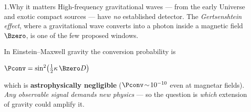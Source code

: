 \begin{block}{1.\quad Why it matters}
  High-frequency gravitational waves --- from the early Universe and exotic
  compact sources --- have \emph{no} established detector. The
  \emph{Gertsenshtein effect}, where a gravitational wave converts into a
  photon inside a magnetic field $\Bzero$, is one of the few proposed windows.

  \vspace{1ex}
  In Einstein--Maxwell gravity the conversion probability is
  \begin{exampleblock}{}
    \centering\large
    $\Pconv = \sin^2\!\big(\tfrac{1}{2}\kappa\,\Bzero D\big)$
  \end{exampleblock}
  which is \textbf{astrophysically negligible} ($\Pconv\!\sim\!10^{-10}$ even at
  magnetar fields). \emph{Any observable signal demands new physics} --- so the
  question is \emph{which} extension of gravity could amplify it.
\end{block}
